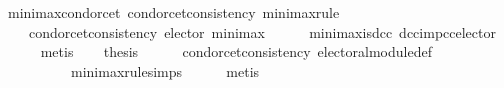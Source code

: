\begin{isabellebody}
\ minimax{\isacharunderscore}{\kern0pt}condorcet{\isacharcolon}{\kern0pt}\ {\isachardoublequoteopen}condorcet{\isacharunderscore}{\kern0pt}consistency\ minimax{\isacharunderscore}{\kern0pt}rule{\isachardoublequoteclose}\isanewline
%
\isadelimproof
%
\endisadelimproof
%
\isatagproof
{}\isamarkupfalse%
\ {\isacharminus}{\kern0pt}\isanewline
\ \ \isamarkupfalse%
\isanewline
\ \ \ \ {\isachardoublequoteopen}condorcet{\isacharunderscore}{\kern0pt}consistency\ {\isacharparenleft}{\kern0pt}elector\ minimax{\isacharparenright}{\kern0pt}{\isachardoublequoteclose}\isanewline
\ \ \ \ \isamarkupfalse%
\ minimax{\isacharunderscore}{\kern0pt}is{\isacharunderscore}{\kern0pt}dcc\ dcc{\isacharunderscore}{\kern0pt}imp{\isacharunderscore}{\kern0pt}cc{\isacharunderscore}{\kern0pt}elector\isanewline
\ \ \ \ \isamarkupfalse%
\ metis\isanewline
\ \ \isamarkupfalse%
\ {\isacharquery}{\kern0pt}thesis\isanewline
\ \ \ \ \isamarkupfalse%
\ condorcet{\isacharunderscore}{\kern0pt}consistency{}\ electoral{\isacharunderscore}{\kern0pt}module{\isacharunderscore}{\kern0pt}def\isanewline
\ \ \ \ \ \ \ \ \ \ minimax{\isacharunderscore}{\kern0pt}rule{\isachardot}{\kern0pt}simps\isanewline
\ \ \ \ \isamarkupfalse%
\ metis\isanewline
{}\isamarkupfalse%
%
\endisatagproof
{\isafoldproof}%
%
\isadelimproof
\isanewline
%
\endisadelimproof
%
\isadelimtheory
\isanewline
%
\endisadelimtheory
%
\isatagtheory
{}\isamarkupfalse%
%
\endisatagtheory
{\isafoldtheory}%
%
\isadelimtheory
%
\endisadelimtheory
%
\end{isabellebody}%
\endinput

